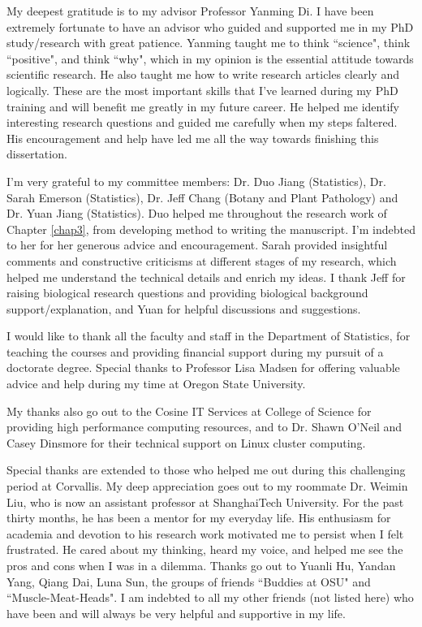 
My deepest gratitude is to my advisor Professor Yanming Di. I have been extremely fortunate to have 
an advisor who guided and supported me in my PhD study/research with great patience. Yanming taught 
me to think ``science", think ``positive", and think ``why", which in my opinion is the essential 
attitude towards scientific research. He also taught me how to write research articles clearly and 
logically. These are the most important skills that I've learned during my PhD training and will 
benefit me greatly in my future career. He helped me identify interesting research questions and 
guided me carefully when my steps faltered. His encouragement and help have led me all the way 
towards finishing this dissertation.

I'm very grateful to my committee members: Dr. Duo Jiang (Statistics), Dr. Sarah Emerson 
(Statistics),  Dr. Jeff Chang (Botany and Plant Pathology) and Dr. Yuan Jiang (Statistics). Duo 
helped me throughout the research work of Chapter \ref{chap3}, from developing method to writing 
the manuscript. I'm indebted to her for her generous advice and encouragement. Sarah provided 
insightful comments and constructive criticisms at different stages of my research, which helped me 
understand the technical details and enrich my ideas. I thank Jeff for raising biological research 
questions and providing biological background support/explanation, and Yuan for helpful discussions 
and suggestions. 

I would like to thank all the faculty and staff in the Department of Statistics, for teaching 
the courses and providing financial support during my pursuit of a doctorate degree. Special 
thanks to Professor Lisa Madsen for offering valuable advice and help during my time at Oregon 
State University. 

My thanks also go out to the Cosine IT Services at College of Science for providing high 
performance computing resources, and to Dr. Shawn O'Neil and Casey Dinsmore for their technical 
support on Linux cluster computing. 

Special thanks are extended to those who helped me out during this challenging period at Corvallis. 
My deep appreciation goes out to my roommate Dr. Weimin Liu, who is now an assistant professor at 
ShanghaiTech University. For the past thirty months, he has been a mentor for my everyday life. His 
enthusiasm for academia and devotion to his research work motivated me to persist when I felt 
frustrated. He cared about my thinking, heard my voice, and helped me see the pros and cons when I 
was in a dilemma. Thanks go out to Yuanli Hu, Yandan Yang, Qiang Dai, Luna Sun, the groups of 
friends ``Buddies at OSU" and ``Muscle-Meat-Heads". I am indebted to all my 
other friends (not listed here) who have been and will always be very helpful and supportive in my 
life.


